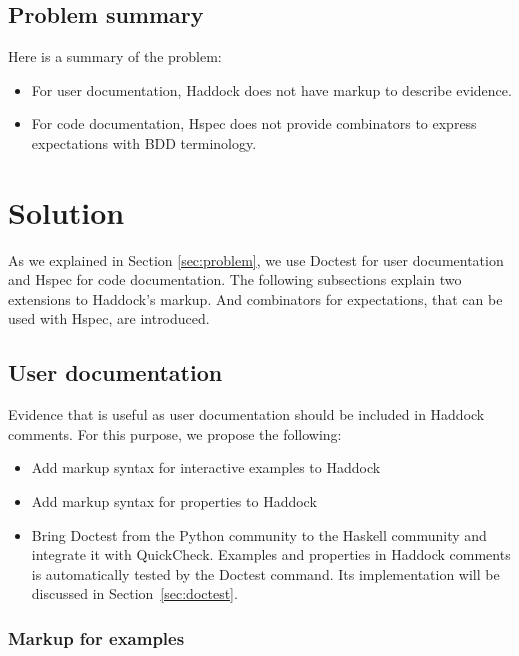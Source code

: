 \documentclass[preprint]{sigplanconf}
\begin{document}
\subsection{Problem summary}

Here is a summary of the problem:

\begin{itemize}
\item
    For user documentation,
    Haddock does not have markup to describe evidence.
\item
    For code documentation,
    Hspec does not provide combinators to express expectations with
    BDD terminology.
\end{itemize}

\section{Solution}

As we explained in Section \ref{sec:problem},
we use Doctest for user documentation and Hspec for code documentation.
The following subsections explain two extensions to Haddock's markup.
And combinators for expectations, that can be used with Hspec, are
introduced.

\subsection{User documentation}
\label{sec:user-doc}



Evidence that is useful as user documentation should be included in
Haddock comments.  For this purpose, we propose the following:

\begin{itemize}
\item Add markup syntax for interactive examples to Haddock
\item Add markup syntax for properties to Haddock
\item Bring Doctest from the Python community to the Haskell
community and integrate it with QuickCheck.
Examples and properties in Haddock comments is automatically
tested by the Doctest command.
Its implementation will be discussed in Section~\ref{sec:doctest}.

\end{itemize}

\subsubsection{Markup for examples}
\end{document}
